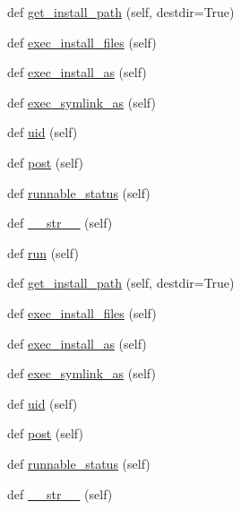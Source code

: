\begin{DoxyCompactItemize}
def \hyperlink{classwaflib_1_1_build_1_1inst_ac41fdf31d2133d81d941b1bd68ed31f6}{get\+\_\+install\+\_\+path} (self, destdir=True)
\item 
def \hyperlink{classwaflib_1_1_build_1_1inst_abf856d52d82ec26f4cc6f76a7c01ac8b}{exec\+\_\+install\+\_\+files} (self)
\item 
def \hyperlink{classwaflib_1_1_build_1_1inst_a0c951c9f7df7638fd030f2b4e1822a62}{exec\+\_\+install\+\_\+as} (self)
\item 
def \hyperlink{classwaflib_1_1_build_1_1inst_adf421fc92d636c0b2380b8fcd1a54de6}{exec\+\_\+symlink\+\_\+as} (self)
\item 
def \hyperlink{classwaflib_1_1_build_1_1inst_af3a833db8b118c295a773017f405de79}{uid} (self)
\item 
def \hyperlink{classwaflib_1_1_build_1_1inst_a747341176f2295022038ca17cf839769}{post} (self)
\item 
def \hyperlink{classwaflib_1_1_build_1_1inst_affb0a840290ad8e000488cc0099950ed}{runnable\+\_\+status} (self)
\item 
def \hyperlink{classwaflib_1_1_build_1_1inst_a32507c568f479fd6409906270834783e}{\+\_\+\+\_\+str\+\_\+\+\_\+} (self)
\item 
def \hyperlink{classwaflib_1_1_build_1_1inst_a0d03fc4440c06aff0a927181771439be}{run} (self)
\item 
def \hyperlink{classwaflib_1_1_build_1_1inst_ac41fdf31d2133d81d941b1bd68ed31f6}{get\+\_\+install\+\_\+path} (self, destdir=True)
\item 
def \hyperlink{classwaflib_1_1_build_1_1inst_abf856d52d82ec26f4cc6f76a7c01ac8b}{exec\+\_\+install\+\_\+files} (self)
\item 
def \hyperlink{classwaflib_1_1_build_1_1inst_a0c951c9f7df7638fd030f2b4e1822a62}{exec\+\_\+install\+\_\+as} (self)
\item 
def \hyperlink{classwaflib_1_1_build_1_1inst_adf421fc92d636c0b2380b8fcd1a54de6}{exec\+\_\+symlink\+\_\+as} (self)
\item 
def \hyperlink{classwaflib_1_1_build_1_1inst_af3a833db8b118c295a773017f405de79}{uid} (self)
\item 
def \hyperlink{classwaflib_1_1_build_1_1inst_a747341176f2295022038ca17cf839769}{post} (self)
\item 
def \hyperlink{classwaflib_1_1_build_1_1inst_affb0a840290ad8e000488cc0099950ed}{runnable\+\_\+status} (self)
\item 
def \hyperlink{classwaflib_1_1_build_1_1inst_a32507c568f479fd6409906270834783e}{\+\_\+\+\_\+str\+\_\+\+\_\+} (self)

\end{DoxyCompactItemize}
